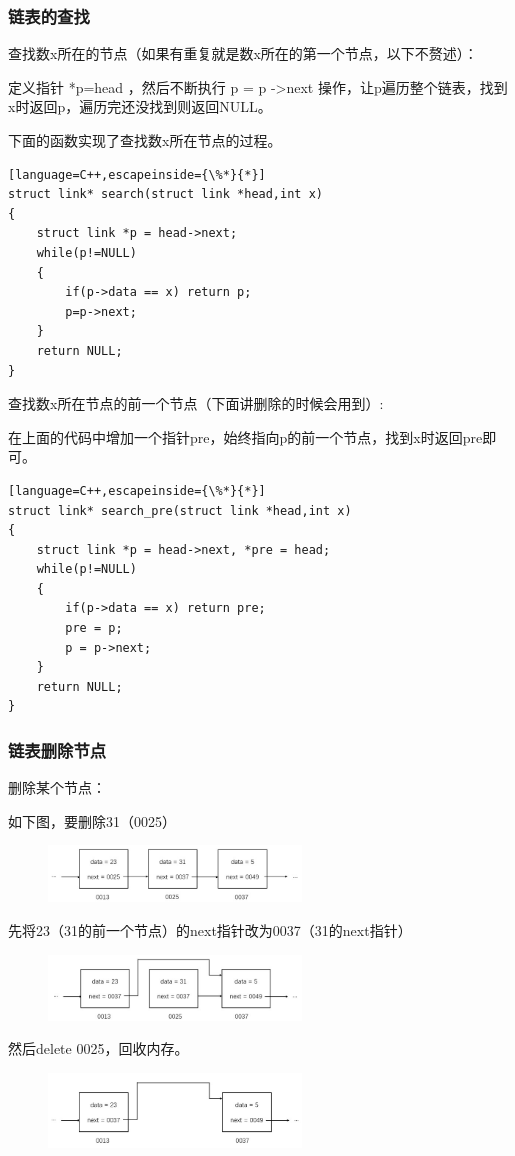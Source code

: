 \documentclass[UTF8]{ctexart}
\begin{document}
\subsubsection{链表的查找}
查找数x所在的节点（如果有重复就是数x所在的第一个节点，以下不赘述）：

定义指针 *p=head ，然后不断执行 p = p -\textgreater next 操作，让p遍历整个链表，找到x时返回p，遍历完还没找到则返回NULL。

下面的函数实现了查找数x所在节点的过程。
\begin{lstlisting}[language=C++,escapeinside={\%*}{*}]
struct link* search(struct link *head,int x)
{
	struct link *p = head->next;
	while(p!=NULL)
	{
		if(p->data == x) return p;
		p=p->next;
	}
	return NULL;
}
\end{lstlisting}
查找数x所在节点的前一个节点（下面讲删除的时候会用到）:

在上面的代码中增加一个指针pre，始终指向p的前一个节点，找到x时返回pre即可。
\begin{lstlisting}[language=C++,escapeinside={\%*}{*}]
struct link* search_pre(struct link *head,int x)
{
	struct link *p = head->next, *pre = head;
	while(p!=NULL)
	{
		if(p->data == x) return pre;
		pre = p;
		p = p->next;
	}
	return NULL;
}
\end{lstlisting}
\subsubsection{链表删除节点}
删除某个节点：

如下图，要删除31（0025）
\begin{figure}[H]
	\centering
	\includegraphics[width=0.6\textwidth,keepaspectratio]{picture/8.1.jpg}
\end{figure}
先将23（31的前一个节点）的next指针改为0037（31的next指针）
\begin{figure}[H]
	\centering
	\includegraphics[width=0.6\textwidth,keepaspectratio]{picture/9.1.jpg}
\end{figure}
然后delete 0025，回收内存。
\begin{figure}[H]
	\centering
	\includegraphics[width=0.6\textwidth,keepaspectratio]{picture/10.1.jpg}
\end{figure}
\end{document}
